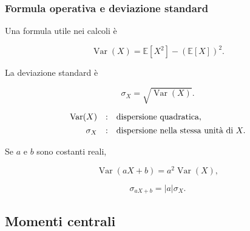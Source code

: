 \documentclass[handout]{beamer}%
\providecommand{\E}{\mathbb{E}}
\providecommand{\1}{\mathbf{1}}
\providecommand{\Var}{\operatorname{Var}}
\providecommand{\QTR}[2]{\csname #1\endcsname{#2}}
\begin{document}
\begin{frame}%
%

\frametitle{Formula operativa e deviazione standard}%


Una formula utile nei calcoli \`{e}%

\[
\Var(X) = \E[X^2]-(\E[X])^{2}.
\]


\medskip

La deviazione standard \`{e}%

\[
\sigma_{X} = \sqrt{\Var(X)}.
\]


\medskip%

\[%
\begin{array}
[c]{rcl}%
\Var(X) & : & \mbox{dispersione quadratica},\\[4pt]%
\sigma_{X} & : & \mbox{dispersione nella stessa unit\`{a} di } X.
\end{array}
\]


\medskip

Se $a$ e $b$ sono costanti reali,%

\[
\Var(aX+b)=a^{2}\Var(X),
\]
%

\[
\sigma_{aX+b}=|a|\sigma_{X}.
\]
%

\transboxout
\end{frame}%




\subsection{Momenti centrali}%
\end{document}
